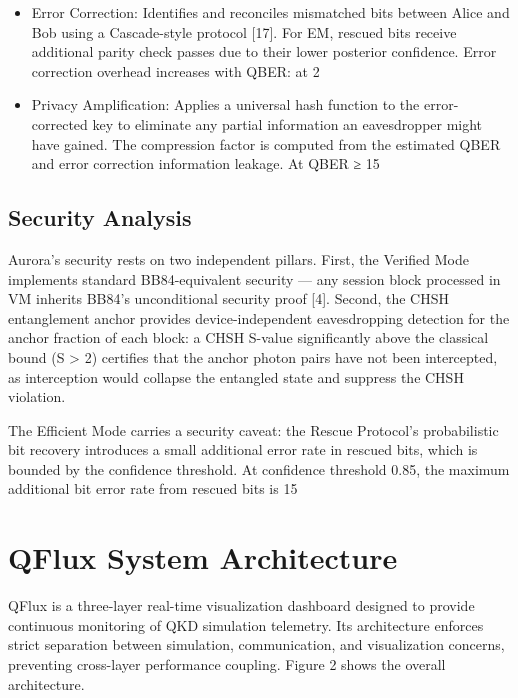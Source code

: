 \begin{itemize}
\item Error Correction: Identifies and reconciles mismatched bits between Alice and Bob using a Cascade-style protocol [17]. For EM, rescued bits receive additional parity check passes due to their lower posterior confidence. Error correction overhead increases with QBER: at 2%
\item Privacy Amplification: Applies a universal hash function to the error-corrected key to eliminate any partial information an eavesdropper might have gained. The compression factor is computed from the estimated QBER and error correction information leakage. At QBER ≥ 15%
\end{itemize}


\subsection{Security Analysis}
Aurora's security rests on two independent pillars. First, the Verified Mode implements standard BB84-equivalent security — any session block processed in VM inherits BB84's unconditional security proof [4]. Second, the CHSH entanglement anchor provides device-independent eavesdropping detection for the anchor fraction of each block: a CHSH S-value significantly above the classical bound (S > 2) certifies that the anchor photon pairs have not been intercepted, as interception would collapse the entangled state and suppress the CHSH violation.

The Efficient Mode carries a security caveat: the Rescue Protocol's probabilistic bit recovery introduces a small additional error rate in rescued bits, which is bounded by the confidence threshold. At confidence threshold 0.85, the maximum additional bit error rate from rescued bits is 15%

\section{QFlux System Architecture}
QFlux is a three-layer real-time visualization dashboard designed to provide continuous monitoring of QKD simulation telemetry. Its architecture enforces strict separation between simulation, communication, and visualization concerns, preventing cross-layer performance coupling. Figure 2 shows the overall architecture.

